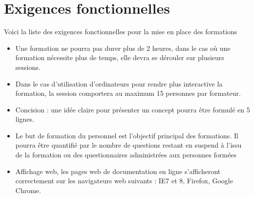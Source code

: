 \section{Exigences fonctionnelles}


Voici la liste des exigences fonctionnelles pour la mise en place des formations \\

\begin{itemize}

\item Une formation ne pourra pas durer plus de 2 heures, dans le cas où une
formation nécessite plus de temps, elle devra se dérouler sur plusieurs sessions.

\item Dans le cas d'utilisation d'ordinateurs pour rendre plus interactive la
formation, la session comportera au maximum 15 personnes par formateur.

\item Concision : une idée claire pour présenter un concept pourra être formulé
en 5 lignes. 

\item Le but de formation du personnel est l'objectif principal des formations. 
Il pourra être quantifié par le nombre de questions restant en suspend à l'issu
de la formation ou des questionnaires administrées aux personnes formées

\item Affichage web, les pages web de documentation en ligne s'afficheront 
correctement sur les navigateurs web suivants : IE7 et 8, Firefox, Google Chrome.

\end{itemize}

